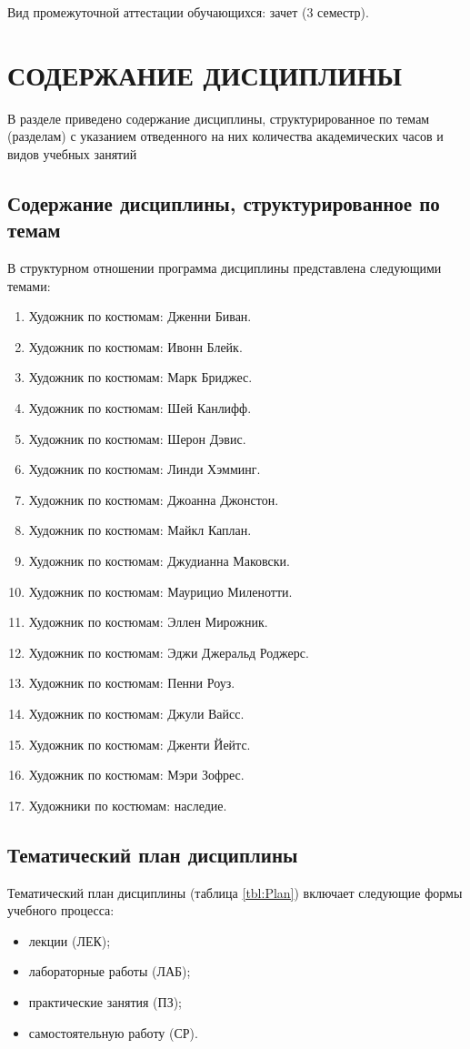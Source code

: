 Вид промежуточной аттестации обучающихся: зачет (3 семестр).

\chapter{СОДЕРЖАНИЕ ДИСЦИПЛИНЫ}
\label{chapt4}

В разделе приведено содержание дисциплины, структурированное по темам (разделам) с указанием отведенного на них количества академических часов и видов учебных занятий

\section{Содержание дисциплины, структурированное по темам}

В структурном отношении программа дисциплины представлена следующими темами:
\begin{enumerate}
\item Художник по костюмам: Дженни Биван.
\item Художник по костюмам: Ивонн Блейк.
\item Художник по костюмам: Марк Бриджес.
\item Художник по костюмам: Шей Канлифф.
\item Художник по костюмам: Шерон Дэвис.
\item Художник по костюмам: Линди Хэмминг.
\item Художник по костюмам: Джоанна Джонстон.
\item Художник по костюмам: Майкл Каплан.
\item Художник по костюмам: Джудианна Маковски.
\item Художник по костюмам: Маурицио Миленотти.
\item Художник по костюмам: Эллен Мирожник.
\item Художник по костюмам: Эджи Джеральд Роджерс.
\item Художник по костюмам: Пенни Роуз.
\item Художник по костюмам: Джули Вайсс.
\item Художник по костюмам: Дженти Йейтс.
\item Художник по костюмам: Мэри Зофрес.
\item Художники по костюмам: наследие.
\end{enumerate}

\section{Тематический план дисциплины}
Тематический план дисциплины (таблица \ref{tbl:Plan}) включает следующие формы учебного процесса:
\begin{itemize}
\item лекции (ЛЕК); 
\item лабораторные работы (ЛАБ); 
\item практические занятия (ПЗ); 
\item самостоятельную работу (СР).
\end{itemize}

